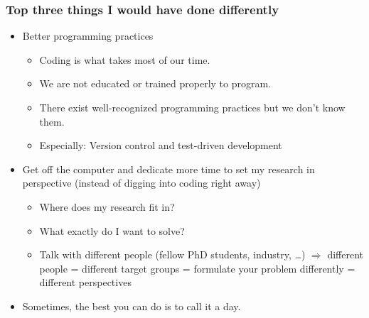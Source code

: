 \documentclass[screen, aspectratio=43]{beamer}
\begin{document}
\begin{frame}
  \frametitle{Top three things I would have done differently}
  \begin{itemize}
  \item Better programming practices
    \begin{itemize}
    \item Coding is what takes most of our time.  
    \item We are not educated or trained properly to program. 
    \item There exist well-recognized programming practices but we don’t know them.  
    \item Especially: Version control and test-driven development
    \end{itemize}
  \item Get off the computer and dedicate more time to set my research in perspective (instead of digging into coding right away)
    \begin{itemize}
    \item Where does my research fit in? 
    \item What exactly do I want to solve? 
    \item Talk with different people (fellow PhD students, industry, …) $\Rightarrow$ different people = different target groups = formulate your problem differently = different perspectives
    \end{itemize}
  \item Sometimes, the best you can do is to call it a day.
  \end{itemize}
\end{frame}
\end{document}
